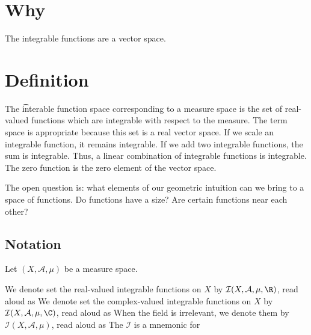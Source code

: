 

\section*{Why}

The integrable functions are a vector space.

\section*{Definition}

The \t{interable function space} corresponding to a measure space is the set of real-valued functions which are integrable with respect to the measure.
The term space is appropriate because this set is a real vector space.
If we scale an integrable function, it remains integrable.
If we add two integrable functions, the sum is integrable.
Thus, a linear combination of integrable functions is integrable.
The zero function is the zero element of the vector space.


The open question is: what elements of our geometric intuition can we bring to a space of functions.
Do functions have a size?
Are certain functions near each other?

\subsection*{Notation}

Let $(X, \mathcal{A} , \mu )$ be a measure space.

We denote set the real-valued integrable functions on $X$ by $\mathcal{I} (X, \mathcal{A} , \mu , \R )$, read aloud as 
We denote set the complex-valued integrable functions on $X$ by $\mathcal{I} (X, \mathcal{A} , \mu , \C )$, read aloud as 
When the field is irrelevant, we denote them by $\mathcal{I} (X, \mathcal{A} , \mu )$, read aloud as 
The $\mathcal{I} $ is a mnemonic for 
